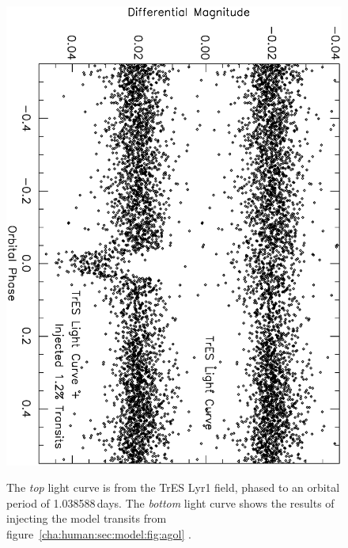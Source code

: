 \begin{figure}
\begin{center}
\centering
\includegraphics[width=.75\textwidth, angle=90]{7_agol_c}\\
\caption[Example of TrES light curve with injected transits]{%
The {\it top} light curve is from the TrES Lyr1 field, phased to an orbital period of 1.038588\,days. The {\it bottom} light curve shows the results of injecting the model transits from figure~\ref{cha:human:sec:model:fig:agol}%
.%
}%
\label{cha:human:sec:model:fig:inject}%
\end{center}
\end{figure}

